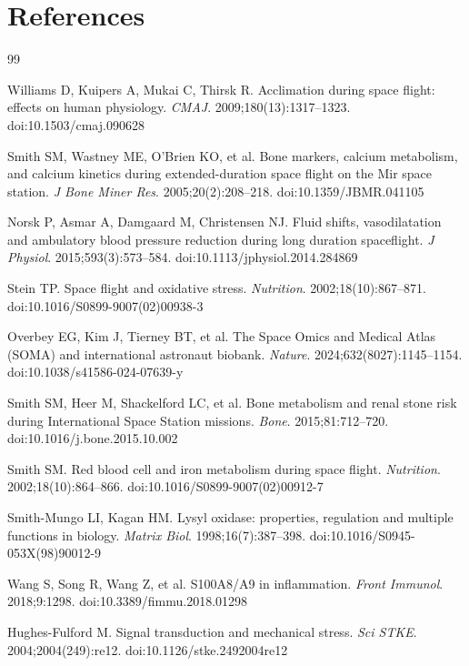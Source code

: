 \documentclass[11pt,a4paper]{article}
\begin{document}
\section*{References}

\begin{thebibliography}{99}

Williams D, Kuipers A, Mukai C, Thirsk R. Acclimation during space flight: effects on human physiology. \textit{CMAJ}. 2009;180(13):1317--1323. doi:10.1503/cmaj.090628

Smith SM, Wastney ME, O'Brien KO, et al. Bone markers, calcium metabolism, and calcium kinetics during extended-duration space flight on the Mir space station. \textit{J Bone Miner Res}. 2005;20(2):208--218. doi:10.1359/JBMR.041105

Norsk P, Asmar A, Damgaard M, Christensen NJ. Fluid shifts, vasodilatation and ambulatory blood pressure reduction during long duration spaceflight. \textit{J Physiol}. 2015;593(3):573--584. doi:10.1113/jphysiol.2014.284869

Stein TP. Space flight and oxidative stress. \textit{Nutrition}. 2002;18(10):867--871. doi:10.1016/S0899-9007(02)00938-3

Overbey EG, Kim J, Tierney BT, et al. The Space Omics and Medical Atlas (SOMA) and international astronaut biobank. \textit{Nature}. 2024;632(8027):1145--1154. doi:10.1038/s41586-024-07639-y

Smith SM, Heer M, Shackelford LC, et al. Bone metabolism and renal stone risk during International Space Station missions. \textit{Bone}. 2015;81:712--720. doi:10.1016/j.bone.2015.10.002

Smith SM. Red blood cell and iron metabolism during space flight. \textit{Nutrition}. 2002;18(10):864--866. doi:10.1016/S0899-9007(02)00912-7

Smith-Mungo LI, Kagan HM. Lysyl oxidase: properties, regulation and multiple functions in biology. \textit{Matrix Biol}. 1998;16(7):387--398. doi:10.1016/S0945-053X(98)90012-9

Wang S, Song R, Wang Z, et al. S100A8/A9 in inflammation. \textit{Front Immunol}. 2018;9:1298. doi:10.3389/fimmu.2018.01298

Hughes-Fulford M. Signal transduction and mechanical stress. \textit{Sci STKE}. 2004;2004(249):re12. doi:10.1126/stke.2492004re12

\end{thebibliography}
\end{document}
